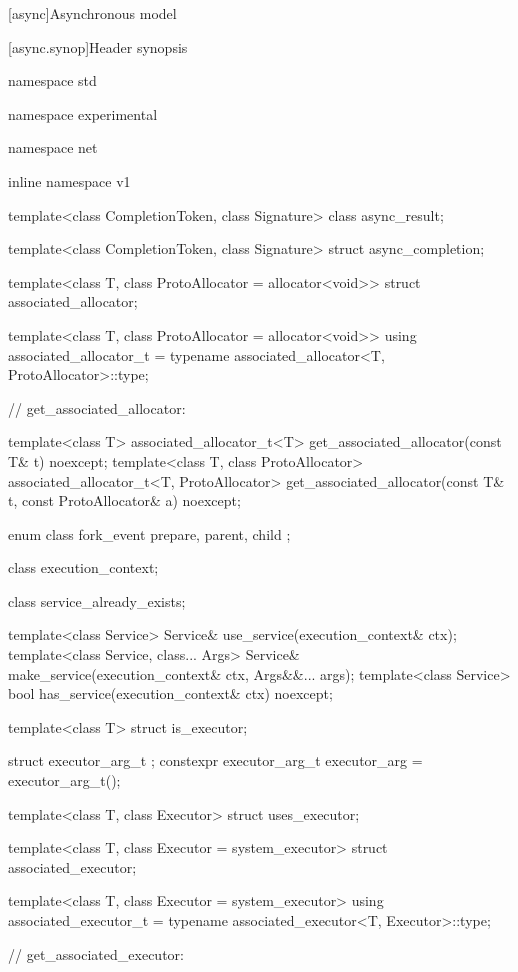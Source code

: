 
[async]{Asynchronous model}


%
[async.synop]{Header  synopsis}

\begin{codeblock}
namespace std {
namespace experimental {
namespace net {
inline namespace v1 {

  template<class CompletionToken, class Signature>
    class async_result;

  template<class CompletionToken, class Signature>
    struct async_completion;

  template<class T, class ProtoAllocator = allocator<void>>
    struct associated_allocator;

  template<class T, class ProtoAllocator = allocator<void>>
    using associated_allocator_t = typename associated_allocator<T, ProtoAllocator>::type;

  // get_associated_allocator:

  template<class T>
    associated_allocator_t<T> get_associated_allocator(const T& t) noexcept;
  template<class T, class ProtoAllocator>
    associated_allocator_t<T, ProtoAllocator>
      get_associated_allocator(const T& t, const ProtoAllocator& a) noexcept;

  enum class fork_event {
    prepare,
    parent,
    child
  };

  class execution_context;

  class service_already_exists;

  template<class Service> Service& use_service(execution_context& ctx);
  template<class Service, class... Args> Service&
    make_service(execution_context& ctx, Args&&... args);
  template<class Service> bool has_service(execution_context& ctx) noexcept;

  template<class T> struct is_executor;

  struct executor_arg_t { };
  constexpr executor_arg_t executor_arg = executor_arg_t();

  template<class T, class Executor> struct uses_executor;

  template<class T, class Executor = system_executor>
    struct associated_executor;

  template<class T, class Executor = system_executor>
    using associated_executor_t = typename associated_executor<T, Executor>::type;

  // get_associated_executor:

}}}}
\end{codeblock}
